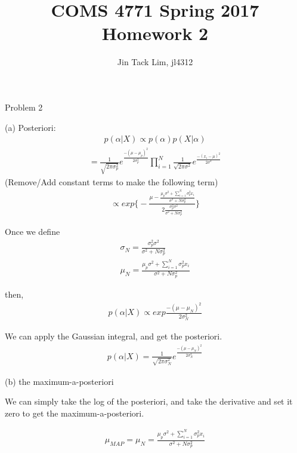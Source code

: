 \documentclass[11pt]{article}
\title{COMS 4771 Spring 2017 Homework 2}
\author{Jin Tack Lim, jl4312
  }
\date{%
  }
\theoremstyle{definition}
\begin{document}
\maketitle



\newcommand{\gau}[3]{
$\frac{1}{{ \sqrt {2\pi #3 ^2} }}e^{ \frac { - \left( {#1 - #2 } \right)^2 } {2#3 ^2}}$
}

\newcommand{\gauraw}[3]{
\frac{1}{{ \sqrt {2\pi #3 ^2} }}e^{ \frac { - \left( {#1 - #2 } \right)^2 } {2#3 ^2}}
}


Problem 2

(a) Posteriori:
\begin{eqnarray}
 p(\alpha | X ) \propto p(\alpha)p(X|\alpha) \nonumber 
\end{eqnarray}
\begin{eqnarray}
 = \gauraw{\mu}{\mu_p}{\sigma_p} \prod_{i=1}^{N} \gauraw{x_i}{\mu}{\sigma} \nonumber
\end{eqnarray}
(Remove/Add constant terms to make the following term)
\begin{eqnarray}
 \propto exp\Bigg\{ - \frac {\mu - \frac{\mu_p\sigma^2 + \sum_{i=1}^{N} \sigma_p^2x_i}{\sigma^2 + N\sigma_p^2}}
		{2 \frac{\sigma_p^2\sigma^2}{\sigma^2 + N\sigma_p^2}} \Bigg\} \nonumber
\end{eqnarray}

Once we define
\begin{eqnarray}
\sigma_N = \frac{\sigma_p^2\sigma^2}{\sigma^2 + N\sigma_p^2} \nonumber \\
\mu_N = \frac{\mu_p\sigma^2 + \sum_{i=1}^{N} \sigma_p^2x_i}{\sigma^2 + N\sigma_p^2} \nonumber
\end{eqnarray}

then,
\begin{eqnarray}
 p(\alpha | X ) \propto exp{\frac{-(\mu - \mu_N)^2}{2\sigma_N^2}} \nonumber 
\end{eqnarray}

We can apply the Gaussian integral, and get the posteriori.
\begin{eqnarray}
 p(\alpha | X ) = \gauraw{\mu}{\mu_N}{\sigma_N} \nonumber
\end{eqnarray}

(b) the maximum-a-posteriori

We can simply take the log of the posteriori, and take the derivative and set it zero to get the maximum-a-posteriori.


\begin{eqnarray}
\mu_{MAP} = \mu_N = \frac{\mu_p\sigma^2 + \sum_{i=1}^{N} \sigma_p^2x_i}{\sigma^2 + N\sigma_p^2} \nonumber
\end{eqnarray}
\end{document}
